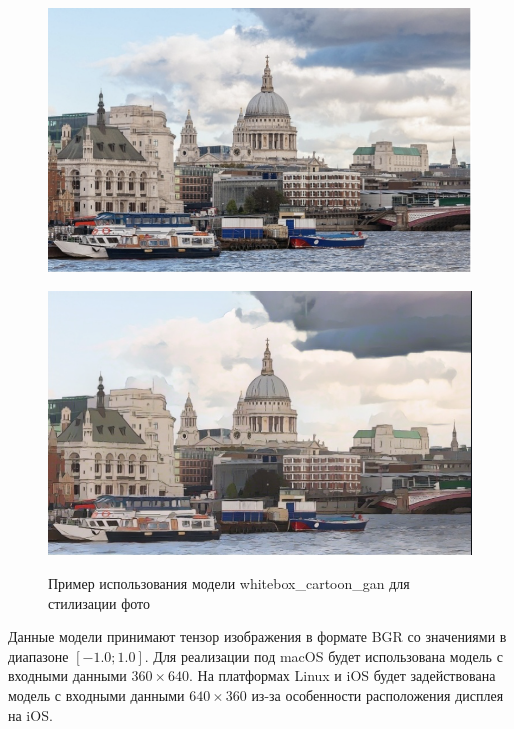 \documentclass[a4paper,14pt]{extreport}
\begin{document}
    \begin{figure}[!h]
        \begin{center}
            \begin{minipage}[!h]{0.45\linewidth}
                \includegraphics[width=1\linewidth]{images-task/real.png}
                \label{ris:graph}
            \end{minipage}
            \hfill
            \begin{minipage}[!h]{0.45\linewidth}
                \includegraphics[width=1\linewidth]{images-task/processed.png}
                \label{ris:pbtxt}
            \end{minipage}
        \end{center}
        \caption{Пример использования модели whitebox\_cartoon\_gan для стилизации фото}
    \end{figure}
    
    Данные модели принимают тензор изображения в формате BGR со значениями в диапазоне $[-1.0; 1.0]$. Для реализации под macOS будет использована модель с входными данными $360 \times 640$. На платформах Linux и iOS будет задействована модель с входными данными $640 \times 360$ из-за особенности расположения дисплея на iOS.
\end{document}
